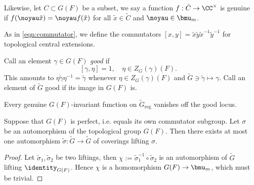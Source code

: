 \documentclass[a4paper,10pt]{article}
\begin{document}
Likewise, let $C \subset G(F)$ be a subset, we say a function $f: \tilde{C} \to \CC^\times$ is genuine if $f(\noyau\tilde{x}) = \noyau f(\tilde{x})$ for all $\tilde{x} \in \tilde{C}$ and $\noyau \in \bmu_m$.

As in \eqref{eqn:commutator}, we define the commutators $[x, y] = \tilde{x}\tilde{y}\tilde{x}^{-1}\tilde{y}^{-1}$ for topological central extensions.
\begin{definition}\label{def:good-element}
	Call an element $\gamma \in G(F)$ \emph{good} if
	\[ [\gamma, \eta]=1, \quad \eta \in Z_G(\gamma)(F). \]
	This amounts to $\eta\tilde{\gamma}\eta^{-1} = \tilde{\gamma}$ whenever $\eta \in Z_G(\gamma)(F)$ and $\tilde{G} \ni \tilde{\gamma} \mapsto \gamma$. Call an element of $\tilde{G}$ good if its image in $G(F)$ is.
\end{definition}
Every genuine $G(F)$-invariant function on $\tilde{G}_\text{reg}$ vanishes off the good locus. 

\begin{proposition}\label{prop:lifting-uniqueness}
	Suppose that $G(F)$ is perfect, i.e. equals its own commutator subgroup. Let $\sigma$ be an automorphism of the topological group $G(F)$. Then there exists at most one automorphism $\tilde{\sigma}: \tilde{G} \to \tilde{G}$ of coverings lifting $\sigma$.
\end{proposition}
\begin{proof}
	Let $\tilde{\sigma}_1, \tilde{\sigma}_2$ be two liftings, then $\chi := \tilde{\sigma}_1^{-1} \circ \tilde{\sigma}_2$ is an automorphism of $\tilde{G}$ lifting $\identity_{G(F)}$. Hence $\chi$ is a homomorphism $G(F) \to \bmu_m$, which must be trivial.
\end{proof}

\end{document}
